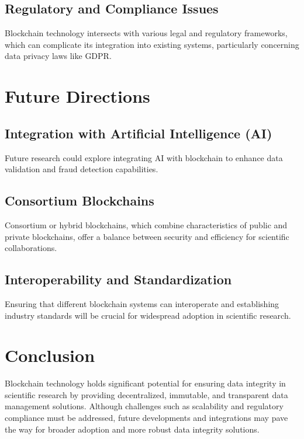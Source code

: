 \documentclass{article}
\begin{document}
\subsection{Regulatory and Compliance Issues}
Blockchain technology intersects with various legal and regulatory frameworks, which can complicate its integration into existing systems, particularly concerning data privacy laws like GDPR.

\section{Future Directions}
\subsection{Integration with Artificial Intelligence (AI)}
Future research could explore integrating AI with blockchain to enhance data validation and fraud detection capabilities.

\subsection{Consortium Blockchains}
Consortium or hybrid blockchains, which combine characteristics of public and private blockchains, offer a balance between security and efficiency for scientific collaborations.

\subsection{Interoperability and Standardization}
Ensuring that different blockchain systems can interoperate and establishing industry standards will be crucial for widespread adoption in scientific research.

\section{Conclusion}
Blockchain technology holds significant potential for ensuring data integrity in scientific research by providing decentralized, immutable, and transparent data management solutions. Although challenges such as scalability and regulatory compliance must be addressed, future developments and integrations may pave the way for broader adoption and more robust data integrity solutions.



\end{document}
